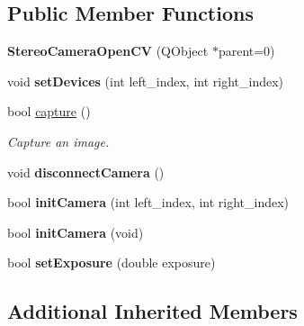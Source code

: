 \subsection*{Public Member Functions}
\begin{DoxyCompactItemize}
\item 
\hypertarget{class_stereo_camera_open_c_v_a719245d43f1ce2f25c875ac9bb7ec6f3}{}{\bfseries Stereo\+Camera\+Open\+C\+V} (Q\+Object $\ast$parent=0)\label{class_stereo_camera_open_c_v_a719245d43f1ce2f25c875ac9bb7ec6f3}

\item 
\hypertarget{class_stereo_camera_open_c_v_a6168a4ae04b223866a8e41365c88aa8e}{}void {\bfseries set\+Devices} (int left\+\_\+index, int right\+\_\+index)\label{class_stereo_camera_open_c_v_a6168a4ae04b223866a8e41365c88aa8e}

\item 
bool \hyperlink{class_stereo_camera_open_c_v_ac669e811da12df2bfd76f783c0550100}{capture} ()
\begin{DoxyCompactList}\small\item\em Capture an image. \end{DoxyCompactList}\item 
\hypertarget{class_stereo_camera_open_c_v_ac09a94c2131ce8b0aa2e4dc743276121}{}void {\bfseries disconnect\+Camera} ()\label{class_stereo_camera_open_c_v_ac09a94c2131ce8b0aa2e4dc743276121}

\item 
\hypertarget{class_stereo_camera_open_c_v_a59c5da56b77dfbfbe94985c196a28777}{}bool {\bfseries init\+Camera} (int left\+\_\+index, int right\+\_\+index)\label{class_stereo_camera_open_c_v_a59c5da56b77dfbfbe94985c196a28777}

\item 
\hypertarget{class_stereo_camera_open_c_v_adf3fb1c866b19ba2fea2ebd36251e075}{}bool {\bfseries init\+Camera} (void)\label{class_stereo_camera_open_c_v_adf3fb1c866b19ba2fea2ebd36251e075}

\item 
\hypertarget{class_stereo_camera_open_c_v_ae6dfcf2aa00ca0f213d2fb0327f23147}{}bool {\bfseries set\+Exposure} (double exposure)\label{class_stereo_camera_open_c_v_ae6dfcf2aa00ca0f213d2fb0327f23147}

\end{DoxyCompactItemize}
\subsection*{Additional Inherited Members}


